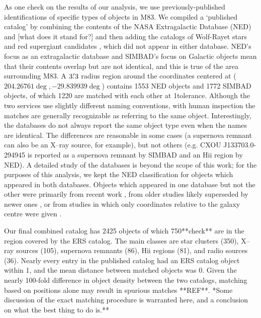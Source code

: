 As one check on the results of our analysis, we use previously-published identifications of specific types of objects in M83.
We compiled a `published catalog' by combining the contents of the NASA Extragalactic Database (NED) and
[what does it stand for?] \citep[SIMBAD][]{wenger2000} and then adding the catalogs of Wolf-Rayet stars \citep{kim12} and
red supergiant candidates \citep{williams15}, which did not appear in either database.
NED's focus as an extragalactic database and SIMBAD's focus on Galactic objects mean that their contents overlap but are not identical, 
and this is true of the area surrounding M83. A $3\hbox{$.\mkern-4mu^\prime$}3$ radius region around the coordinates centered at  ($204.26761\deg, -29.839939\deg$)
contains 1553 NED objects and 1772 SIMBAD objects, of which 1220 are matched with each other at 1\arcsec tolerance.
Although the two services use slightly different naming conventions, with human inspection the matches are generally recognizable as referring
to the same object. Interestingly, the databases do not always report the same object type even when the names are identical.
The differences are reasonable in some cases (a supernova remnant can also be an X--ray source, for example), but not others
(e.g. CXOU J133703.0-294945 is reported as a supernova remnant by SIMBAD and an H{\sci ii} region by NED).
A detailed study of the databases is beyond the scope of this work; for the purposes of this analysis, we kept the NED classification
for objects which appeared in both databases.
Objects which appeared in one database but not the other were primarily from recent work \citep[e.g.][]{long2014}, from
older studies likely superseded by newer ones \citep[e.g.][]{larsen1999}, or from studies in which only coordinates relative to
the galaxy centre were given \citep{rumstay83,dvpd83}.

Our final combined catalog has 2425 objects of which 750**check** are in the region covered by the ERS catalog.
The main classes are star clusters (350), X--ray sources (105), supernova remnants (86), H{\sc ii} regions (81),  and
radio sources (36).
Nearly every entry in the published catalog had an ERS catalog object within 1\arcsec, and the mean distance between
matched objects was 0.
Given the nearly 100-fold difference in object density between the two catalogs, matching based on positions alone may 
result in spurious matches **REF**. *Some discussion of the exact matching procedure is warranted here, and a conclusion
on what the best thing to do is.**




